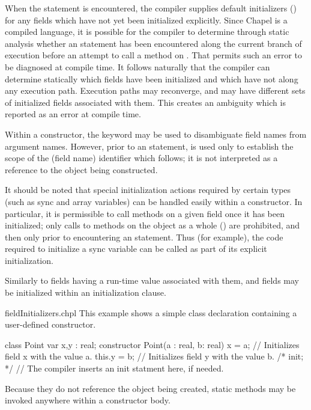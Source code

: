 When the  statement is encountered, the compiler supplies default
initializers () for any fields which have not yet
been initialized explicitly.  Since Chapel is a compiled language, it is
possible for the compiler to determine through static analysis whether
an  statement has been encountered along the current branch of
execution before an attempt to call a method on .  That permits such
an error to be diagnosed at compile time.  It follows naturally that the
compiler can determine statically which fields have been initialized and which
have not along any execution path.  Execution paths may reconverge, and may have
different sets of initialized fields associated with them.  This creates an
ambiguity which is reported as an error at compile time.

Within a constructor, the  keyword may be used to disambiguate field
names from argument names.  However, prior to an  statement, 
 is used only to establish the scope of the (field name) identifier
which follows; it is not interpreted as a reference to the object being constructed.

It should be noted that special initialization actions required by certain types
(such as sync and array variables) can be handled easily within a constructor.
In particular, it is permissible to call
methods on a given field once it has been initialized; only calls to methods on
the object as a whole () are prohibited, and then only prior to
encountering an  statement.  Thus (for example), the code required to
initialize a sync variable can be called as part of its explicit initialization.

Similarly to fields having a run-time value associated with them, 
and  fields may be initialized within an initialization clause.

\begin{chapelexample}{fieldInitializers.chpl}
This example shows a simple class declaration containing a user-defined constructor.
\begin{chapel}
class Point { 
  var x,y : real; 
  constructor Point(a : real, b: real)
  { x = a;          // Initializes field x with the value a.
    this.y = b;     // Initializes field y with the value b.
    /* init; */     // The compiler inserts an init statment here, if needed.
  }
}
\end{chapel}
\end{chapelexample}
\noindent
Because they do not reference the object being created, static methods may be
invoked anywhere within a constructor body.

